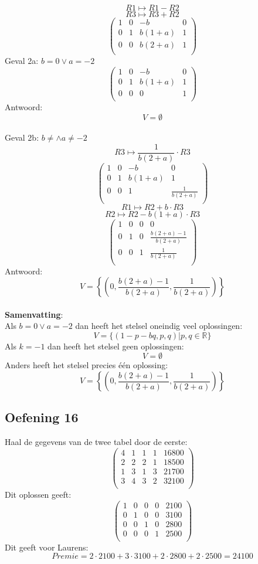 \documentclass[lineaire_algebra_oplossingen.tex]{subfiles}
\begin{document}
\[ R1 \longmapsto R1 - R2 \]
\[ R3 \longmapsto R3 + R2 \]
\[
\begin{pmatrix}
1 & 0 & -b & 0\\
0 & 1 & b(1+a) & 1\\
0 & 0 & b(2+a) & 1\\
\end{pmatrix}
\]
Geval 2a: $b=0 \vee a=-2$
\[
\begin{pmatrix}
1 & 0 & -b & 0\\
0 & 1 & b(1+a) & 1\\
0 & 0 & 0 & 1\\
\end{pmatrix}
\]
Antwoord:
\[
V=\emptyset
\]\\
Geval 2b: $b\neq \wedge a \neq -2$
\[ R3 \longmapsto \frac{1}{b(2+a)}\cdot R3 \]
\[
\begin{pmatrix}
1 & 0 & -b & 0\\
0 & 1 & b(1+a) & 1\\
0 & 0 & 1 & \frac{1}{b(2+a)}\\
\end{pmatrix}
\]
\[ R1 \longmapsto R2 + b\cdot R3 \]
\[ R2 \longmapsto R2 - b(1+a)\cdot R3 \]
\[
\begin{pmatrix}
1 & 0 & 0 & 0\\
0 & 1 & 0 & \frac{b(2+a)-1}{b(2+a)}\\
0 & 0 & 1 & \frac{1}{b(2+a)}\\
\end{pmatrix}
\]
Antwoord:
\[
V=\left\lbrace\left(0,\frac{b(2+a)-1}{b(2+a)}, \frac{1}{b(2+a)}\right)\right\rbrace
\]\\
\textbf{Samenvatting}:\\
Als  $b=0 \vee a=-2$ dan heeft het stelsel oneindig veel oplossingen:
\[
V = \{ (1-p-bq,p,q) | p,q \in \mathbb{R} \}
\]
Als $k=-1$ dan heeft het stelsel geen oplossingen:
\[
V=\emptyset
\]
Anders heeft het stelsel precies één oplossing:
\[
V=\left\lbrace\left(0,\frac{b(2+a)-1}{b(2+a)}, \frac{1}{b(2+a)}\right)\right\rbrace
\]
\subsection{Oefening 16}
Haal de gegevens van de twee tabel door de eerste:
\[
\begin{pmatrix}
4 & 1 & 1 & 1 & 16800\\
2 & 2 & 2 & 1 & 18500\\
1 & 3 & 1 & 3 & 21700\\
3 & 4 & 3 & 2 & 32100\\
\end{pmatrix}
\]
Dit oplossen geeft:
\[
\begin{pmatrix}
1 & 0 & 0 & 0 & 2100\\
0 & 1 & 0 & 0 & 3100\\
0 & 0 & 1 & 0 & 2800\\
0 & 0 & 0 & 1 & 2500\\
\end{pmatrix}
\]
Dit geeft voor Laurens:
\[
Premie = 2\cdot 2100 + 3\cdot 3100 + 2\cdot 2800 + 2\cdot 2500 = 24100
\]
\end{document}
